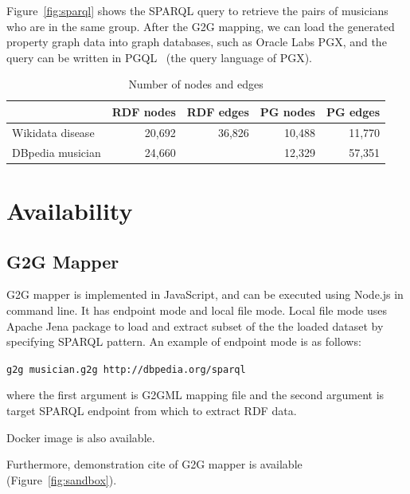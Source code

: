 \documentclass[runningheads]{llncs}
\begin{document}
Figure~\ref{fig:sparql} shows the SPARQL query to retrieve the pairs of musicians who are in the same group. After the G2G mapping, we can load the generated property graph data into graph databases, such as Oracle Labs PGX, and the query can be written in PGQL~\cite{pgql} (the query language of PGX).

\begin{table}[h]
    \centering
    \begin{tabular}{l|r|r|r|r}
        \hline
        & RDF nodes & RDF edges & PG nodes & PG edges \\
        \hline
        Wikidata disease & 20,692 & 36,826 & 10,488 & 11,770 \\
        DBpedia musician & 24,660 &  & 12,329 & 57,351 \\
        \hline
    \end{tabular}
    \caption{Number of nodes and edges}
    \label{tab:my_label}
\end{table}


\section{Availability}

\subsection{G2G Mapper}

G2G mapper is implemented in JavaScript, and can be executed using Node.js in command line. It has endpoint mode and local file mode. Local file mode uses Apache Jena package to load and extract subset of the the loaded dataset by specifying SPARQL pattern. An example of endpoint mode is as follows:

\texttt{g2g musician.g2g http://dbpedia.org/sparql}

\noindent where the first argument is G2GML mapping file and the second argument is target SPARQL endpoint from which to extract RDF data.

Docker image is also available.

Furthermore, demonstration cite of G2G mapper is available (Figure~\ref{fig:sandbox}).
\end{document}
